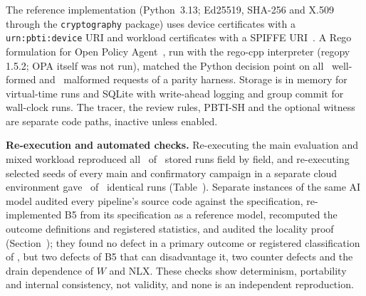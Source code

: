 The reference implementation (Python~3.13; Ed25519, SHA-256 and X.509~\cite{rfc5280} through the \texttt{cryptography} package) uses device certificates with a \texttt{urn:pbti:device} URI and workload certificates with a SPIFFE URI~\cite{spiffe_spec}. A Rego formulation for Open Policy Agent~\cite{opa}, run with the rego-cpp interpreter (regopy 1.5.2; OPA itself was not run), matched the Python decision point on all \VParityWellFormedN\ well-formed and \VParityMalformedReqN\ malformed requests of a parity harness. Storage is in memory for virtual-time runs and SQLite with write-ahead logging and group commit for wall-clock runs. The tracer, the review rules, PBTI-SH and the optional witness are separate code paths, inactive unless enabled.

\textbf{Re-execution and automated checks.} Re-executing the main evaluation and mixed workload reproduced all \WAzeroIdentical\ of \WAzeroCompared\ stored runs field by field, and re-executing selected seeds of every main and confirmatory campaign in a separate cloud environment gave \XRxIdentical\ of \XRxRuns\ identical runs (Table~). Separate instances of the same AI model audited every pipeline's source code against the specification, re-implemented B5 from its specification as a reference model, recomputed the outcome definitions and registered statistics, and audited the locality proof (Section~); they found no defect in a primary outcome or registered classification of \sys, but two defects of B5 that can disadvantage it, two counter defects and the drain dependence of $W$ and NLX. These checks show determinism, portability and internal consistency, not validity, and none is an independent reproduction.

